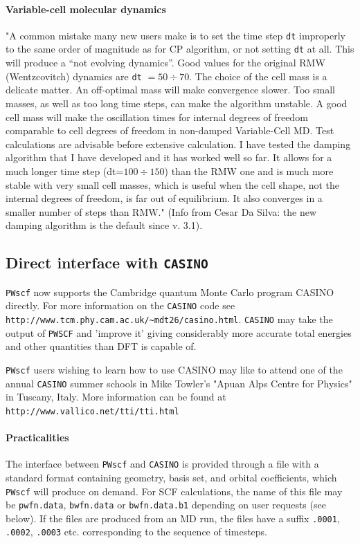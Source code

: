 \documentclass[12pt,a4paper]{article}
\begin{document}
\paragraph{Variable-cell molecular dynamics}

"A common mistake many new users make is to set the time step \texttt{dt}
improperly to the same order of magnitude as for CP algorithm, or
not setting \texttt{dt} at all. This will produce a ``not evolving dynamics''.
Good values for the original RMW (Wentzcovitch) dynamics are 
\texttt{dt} $ = 50 \div 70$. The choice of the cell mass is a
delicate matter. An
off-optimal mass will make convergence slower. Too small masses, as
well as too long time steps, can make the algorithm unstable. A good
cell mass will make the oscillation times for internal degrees of
freedom comparable to cell degrees of freedom in non-damped
Variable-Cell MD. Test calculations are advisable before extensive
calculation. I have tested the damping algorithm that I have developed
and it has worked well so far. It allows for a much longer time step
(dt=$100 \div 150$) than the RMW one and is much more stable with very
small cell masses, which is useful when the cell shape, not the
internal degrees of freedom, is far out of equilibrium. It also
converges in a smaller number of steps than RMW." (Info from Cesar Da
Silva: the new damping algorithm is the default since v. 3.1).

\subsection{Direct interface with \texttt{CASINO}} \label{pw2casino_info}

\texttt{PWscf} now supports the Cambridge quantum Monte Carlo program CASINO directly. For more information
on the \texttt{CASINO} code see \texttt{http://www.tcm.phy.cam.ac.uk/\~{}mdt26/casino.html}. 
\texttt{CASINO} may take the output of \texttt{PWSCF} and
'improve it' giving considerably more accurate total energies and other
quantities than DFT is capable of.


\texttt{PWscf} users wishing to learn how to use CASINO may like to attend one
of the annual \texttt{CASINO} summer schools in Mike Towler's "Apuan Alps Centre
for Physics" in Tuscany, Italy. More information can be found at \texttt{http://www.vallico.net/tti/tti.html} 
\paragraph{Practicalities}
The interface between \texttt{PWscf} and \texttt{CASINO} is provided through a file with a
standard format containing geometry, basis set, and orbital coefficients, which
\texttt{PWscf} will produce on demand. For SCF calculations, the name of this file may
be \texttt{pwfn.data}, \texttt{bwfn.data} or \texttt{bwfn.data.b1} depending on user requests (see below).
If the files are produced from an MD run, the files have a suffix \texttt{.0001}, \texttt{.0002},
\texttt{.0003} etc.  corresponding to the sequence of timesteps.
\end{document}
